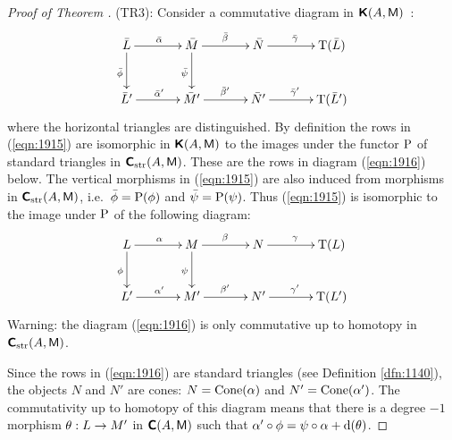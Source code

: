 \begin{proof}[Proof of Theorem \tup{\ref{thm:1255}}]
\medskip \noindent
(TR3): 
Consider a commutative diagram in $\boldsymbol{\mathsf{K}}(A, \operatorname{\mathsf{M}})$~:
\begin{equation} \label{eqn:1915}
\UseTips \xymatrix @C=8ex @R=6ex { 
\bar{L} 
\ar[r]^{\bar{\al}}
\ar[d]_{\bar{\phi}}
&
\bar{M}
\ar[r]^{\bar{\be}}
\ar[d]_{\bar{\psi}}
& 
\bar{N}
\ar[r]^{\bar{\ga}}
&
\opn{T}(\bar{L})
\\
\bar{L}' 
\ar[r]^{\bar{\al}'}
&
\bar{M}'
\ar[r]^{\bar{\be}'}
& 
\bar{N}'
\ar[r]^{\bar{\ga}'}
&
\opn{T}(\bar{L}') 
}
\end{equation}
where the horizontal triangles are distinguished. 
By definition the rows in (\ref{eqn:1915}) are isomorphic in 
$\boldsymbol{\mathsf{K}}(A, \operatorname{\mathsf{M}})$
to the images under the functor $\operatorname{P}$ of 
standard triangles in $\boldsymbol{\mathsf{C}}_{\mathrm{str}}(A, \operatorname{\mathsf{M}})$. These are the rows in 
diagram (\ref{eqn:1916}) below. 
The vertical morphisms in  (\ref{eqn:1915}) are also induced from morphisms in 
$\boldsymbol{\mathsf{C}}_{\mathrm{str}}(A, \operatorname{\mathsf{M}})$, i.e.\ 
$\bar{\phi} = \operatorname{P}(\phi)$ and  $\bar{\psi} = \operatorname{P}(\psi)$. 
Thus (\ref{eqn:1915}) is isomorphic to the image under $\operatorname{P}$ of the 
following diagram:
\begin{equation} \label{eqn:1916}
\UseTips \xymatrix @C=8ex @R=6ex { 
L 
\ar[r]^{\al}
\ar[d]_{\phi}
&
M
\ar[r]^{\be}
\ar[d]_{\psi}
& 
N
\ar[r]^{\ga}
&
\opn{T}(L)
\\
L' 
\ar[r]^{\al'}
&
M'
\ar[r]^{\be'}
& 
N'
\ar[r]^{\ga'}
&
\opn{T}(L') 
} 
\end{equation}
Warning: the diagram (\ref{eqn:1916}) is only  commutative up to homotopy in 
 $\boldsymbol{\mathsf{C}}_{\mathrm{str}}(A, \operatorname{\mathsf{M}})$.

Since the rows in (\ref{eqn:1916}) are standard triangles
(see Definition \ref{dfn:1140}), the objects $N$ and 
$N'$ are cones: $N = \operatorname{Cone}(\alpha)$ and $N' = \operatorname{Cone}(\alpha')$.
The commutativity up to homotopy of this diagram means 
that there is a degree $-1$ morphism 
$\theta : L \to M'$ in $\boldsymbol{\mathsf{C}}(A, \operatorname{\mathsf{M}})$ such that
$\alpha' \circ \phi = \psi \circ \alpha + \mathrm{d}(\theta)$.


\end{proof}

